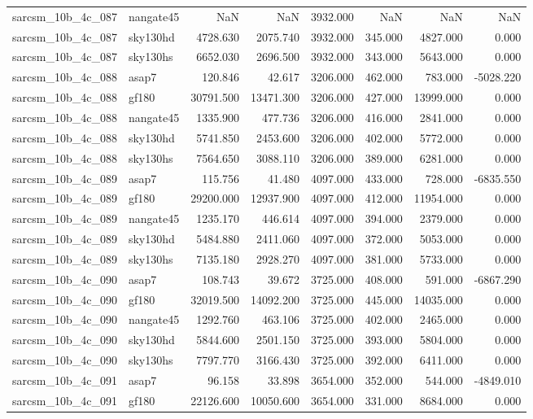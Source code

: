 \begin{tabular}{llrrrrrr}
sarcsm\_10b\_4c\_087 & nangate45 & NaN & NaN & 3932.000 & NaN & NaN & NaN \\
sarcsm\_10b\_4c\_087 & sky130hd & 4728.630 & 2075.740 & 3932.000 & 345.000 & 4827.000 & 0.000 \\
sarcsm\_10b\_4c\_087 & sky130hs & 6652.030 & 2696.500 & 3932.000 & 343.000 & 5643.000 & 0.000 \\
sarcsm\_10b\_4c\_088 & asap7 & 120.846 & 42.617 & 3206.000 & 462.000 & 783.000 & -5028.220 \\
sarcsm\_10b\_4c\_088 & gf180 & 30791.500 & 13471.300 & 3206.000 & 427.000 & 13999.000 & 0.000 \\
sarcsm\_10b\_4c\_088 & nangate45 & 1335.900 & 477.736 & 3206.000 & 416.000 & 2841.000 & 0.000 \\
sarcsm\_10b\_4c\_088 & sky130hd & 5741.850 & 2453.600 & 3206.000 & 402.000 & 5772.000 & 0.000 \\
sarcsm\_10b\_4c\_088 & sky130hs & 7564.650 & 3088.110 & 3206.000 & 389.000 & 6281.000 & 0.000 \\
sarcsm\_10b\_4c\_089 & asap7 & 115.756 & 41.480 & 4097.000 & 433.000 & 728.000 & -6835.550 \\
sarcsm\_10b\_4c\_089 & gf180 & 29200.000 & 12937.900 & 4097.000 & 412.000 & 11954.000 & 0.000 \\
sarcsm\_10b\_4c\_089 & nangate45 & 1235.170 & 446.614 & 4097.000 & 394.000 & 2379.000 & 0.000 \\
sarcsm\_10b\_4c\_089 & sky130hd & 5484.880 & 2411.060 & 4097.000 & 372.000 & 5053.000 & 0.000 \\
sarcsm\_10b\_4c\_089 & sky130hs & 7135.180 & 2928.270 & 4097.000 & 381.000 & 5733.000 & 0.000 \\
sarcsm\_10b\_4c\_090 & asap7 & 108.743 & 39.672 & 3725.000 & 408.000 & 591.000 & -6867.290 \\
sarcsm\_10b\_4c\_090 & gf180 & 32019.500 & 14092.200 & 3725.000 & 445.000 & 14035.000 & 0.000 \\
sarcsm\_10b\_4c\_090 & nangate45 & 1292.760 & 463.106 & 3725.000 & 402.000 & 2465.000 & 0.000 \\
sarcsm\_10b\_4c\_090 & sky130hd & 5844.600 & 2501.150 & 3725.000 & 393.000 & 5804.000 & 0.000 \\
sarcsm\_10b\_4c\_090 & sky130hs & 7797.770 & 3166.430 & 3725.000 & 392.000 & 6411.000 & 0.000 \\
sarcsm\_10b\_4c\_091 & asap7 & 96.158 & 33.898 & 3654.000 & 352.000 & 544.000 & -4849.010 \\
sarcsm\_10b\_4c\_091 & gf180 & 22126.600 & 10050.600 & 3654.000 & 331.000 & 8684.000 & 0.000 \\

\end{tabular}

